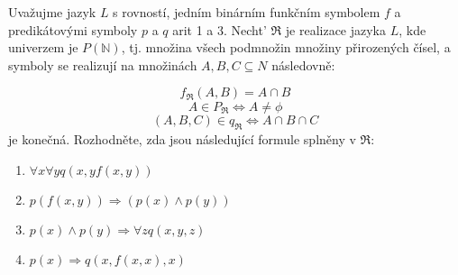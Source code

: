 \subsubsection{}
Uvažujme jazyk $L$ s rovností, jedním binárním funkčním symbolem $f$ a
predikátovými symboly $p$ a $q$ arit 1 a 3. Necht' $\Re$ je realizace jazyka $L$, 
kde univerzem je $P(\mathbb{N})$, tj. množina všech podmnožin množiny přirozených čísel, a symboly se realizují
na množinách $A, B, C \subseteq  N$ následovně:

$$f_{\Re }(A,B)=A\cap B$$
$$A \in P_{\Re} \Leftrightarrow A \neq \phi $$
$$(A,B,C) \in q_{\Re} \Leftrightarrow A \cap B \cap C$$ je konečná.
Rozhodněte, zda jsou následující formule splněny v $\Re$:
\begin{enumerate}[1)]
  \item $\forall x \forall y q(x,yf(x,y))$
  \item $p(f(x,y)) \Rightarrow (p(x) \wedge p(y))$
  \item $p(x) \wedge p(y) \Rightarrow \forall z q(x,y,z)$
  \item $p(x) \Rightarrow q(x, f(x,x), x)$
\end{enumerate}
